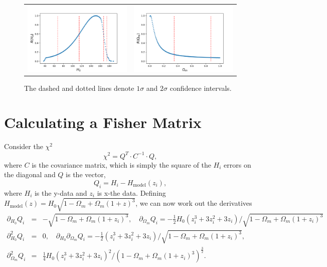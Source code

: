 \documentclass[aps,prl,10pt,twocolumn,superscriptaddress, nofootinbib]{revtex4}
\def\be{\begin{equation}}
\def\ee{\end{equation}}
\def\bea{\begin{eqnarray}}
\def\eea{\end{eqnarray}}
\newcommand{\nn}{\nonumber \\}
\begin{document}
\begin{figure}[htb]
   \centering
   \begin{tabular}{cc}
\includegraphics[width=80mm] {pressureless_matter/H0_R_zmin1.png} & \includegraphics[width=80mm] {pressureless_matter/om_R_zmin1.png}
\end{tabular}
\caption{The dashed and dotted lines denote $1 \sigma$ and $2 \sigma$ confidence intervals.}
\label{fig:R_zmin1} 
\end{figure}

\appendix 

\section{Calculating a Fisher Matrix}
Consider the $\chi^2$
\be
\chi^2 = Q^{T} \cdot C^{-1} \cdot Q, 
\ee
where $C$ is the covariance matrix, which is simply the square of the $H_i$ errors on the diagonal and $Q$ is the vector, 
\be
Q_i = H_i - H_{\textrm{model}}(z_i), 
\ee
where $H_i$ is the y-data and $z_i$ is x-the data. Defining $H_{\textrm{model}}(z) = H_0 \sqrt{1-\Omega_m + \Omega_m (1+z)^3}$, we can now work out the derivatives
\bea
\partial_{H_0} Q_i &=& -\sqrt{1-\Omega_m + \Omega_m (1+z_i)^3}, \quad  \partial_{\Omega_m} Q_i = - \frac{1}{2} H_0 (z_i^3 + 3 z_i^2 + 3 z_i)/\sqrt{1-\Omega_m + \Omega_m (1+z_i)^3} \nn 
\partial^2_{H_0} Q_i &=& 0, \quad
\partial_{H_0} \partial_{\Omega_m} Q_i = - \frac{1}{2} (z_i^3 + 3 z_i^2 + 3 z_i)/\sqrt{1-\Omega_m + \Omega_m (1+z_i)^3}, \\
\partial^2_{\Omega_m} Q_i &=& \frac{1}{4} H_0 (z_i^3 + 3 z_i^2 + 3 z_i)^2/(1-\Omega_m + \Omega_m (1+z_i)^3)^{\frac{3}{2}}. 
\eea
\end{document}
